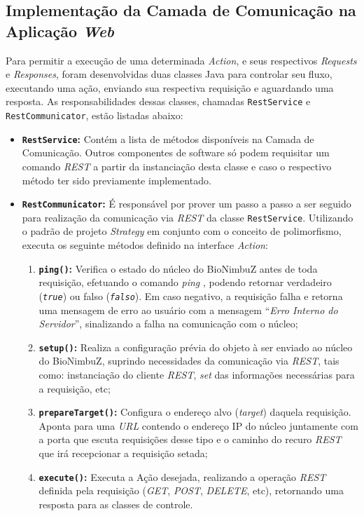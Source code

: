 \subsection{Implementação da Camada de Comunicação na Aplicação \textit{Web}} \label{cap5sec5subsec1}

Para permitir a execução de uma determinada \textit{Action}, e seus respectivos \textit{Requests} e \textit{Responses}, foram desenvolvidas duas classes Java para controlar seu fluxo, executando uma ação, enviando sua respectiva requisição e aguardando uma resposta. As responsabilidades dessas classes, chamadas \texttt{RestService} e \texttt{RestCommunicator}, estão listadas abaixo:

\begin{itemize}
	\item \textbf{\texttt{RestService}:} Contém a lista de métodos disponíveis na Camada de Comunicação. Outros componentes de software só podem requisitar um comando \textit{REST} a partir da instanciação desta classe e caso o respectivo método ter sido previamente implementado.
	\item \textbf{\texttt{RestCommunicator}:} É responsável por prover um passo a passo a ser seguido para realização da comunicação via \textit{REST} da classe \texttt{RestService}. Utilizando o padrão de projeto \textit{Strategy} \cite{head_first_book} em conjunto com o conceito de polimorfismo, executa os seguinte métodos definido na interface \textit{Action}:
	\begin{enumerate}
		\item \textbf{\texttt{ping()}:} Verifica o estado do núcleo do BioNimbuZ antes de toda requisição, efetuando o comando \textit{ping} \cite{ping_rfc}, podendo retornar verdadeiro (\texttt{\textit{true}}) ou falso (\texttt{\textit{falso}}). Em caso negativo, a requisição falha e retorna uma mensagem de erro ao usuário com a mensagem ``\textit{Erro Interno do Servidor}'', sinalizando a falha na comunicação com o núcleo;
		\item \textbf{\texttt{setup()}:} Realiza a configuração prévia do objeto à ser enviado ao núcleo do BioNimbuZ, suprindo necessidades da comunicação via \textit{REST}, tais como: instanciação do cliente \textit{REST}, \textit{set} das informações necessárias para a requisição, etc;
		\item \textbf{\texttt{prepareTarget()}:} Configura o endereço alvo (\textit{target}) daquela requisição. Aponta para uma \textit{URL} contendo o endereço IP do núcleo juntamente com a porta que escuta requisições desse tipo e o caminho do recuro \textit{REST} \cite{rest} que irá recepcionar a requisição setada;
		\item \textbf{\texttt{execute()}:} Executa a Ação desejada, realizando a operação \textit{REST} definida pela requisição (\textit{GET}, \textit{POST}, \textit{DELETE}, etc), retornando uma resposta para as classes de controle.
	\end{enumerate}
\end{itemize}

